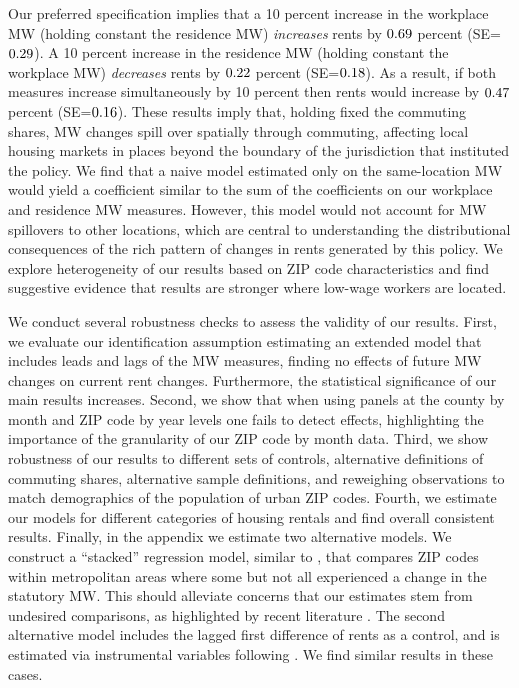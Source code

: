 Our preferred specification implies that 
a 10 percent increase in the workplace MW (holding constant the residence MW) 
\textit{increases} rents by $\textnormal{0.69}$ percent 
(SE=$\textnormal{0.29}$).
A 10 percent increase in the residence MW (holding constant the workplace MW) 
\textit{decreases} rents by $\textnormal{0.22}$ percent 
(SE=$\textnormal{0.18}$). 
As a result, if both measures increase simultaneously by 10 percent then 
rents would increase by $\textnormal{0.47}$ percent 
(SE=$\textnormal{0.16}$).
These results imply that, holding fixed the commuting shares, MW 
changes spill over spatially through commuting, affecting local housing markets 
in places beyond the boundary of the jurisdiction that instituted the policy.
We find that a naive model estimated only on the same-location MW would yield a 
coefficient similar to the sum of the coefficients on our workplace and 
residence MW measures.
However, this model would not account for MW spillovers to other locations, 
which are central to understanding the distributional consequences of the rich 
pattern of changes in rents generated by this policy.
We explore heterogeneity of our results based on ZIP code characteristics and
find suggestive evidence that results are stronger where low-wage workers are 
located.


We conduct several robustness checks to assess the validity of our results.
First, we evaluate our identification assumption estimating an extended model 
that includes leads and lags of the MW measures, finding no effects of future 
MW changes on current rent changes.
Furthermore, the statistical significance of our main results increases.
Second, we show that when using panels at the county by month and ZIP code by 
year levels one fails to detect effects, highlighting the importance of the 
granularity of our ZIP code by month data.
Third, we show robustness of our results to different sets of controls,
alternative definitions of commuting shares, alternative sample definitions,
and reweighing observations to match demographics of the population of
urban ZIP codes.
Fourth, we estimate our models for different categories of housing rentals and
find overall consistent results.
Finally, in the appendix we estimate two alternative models.
We construct a ``stacked'' regression model, similar to \textcite{CegnizEtAl2019},
that compares ZIP codes within metropolitan areas where some but not all 
experienced a change in the statutory MW.
This should alleviate concerns that our estimates stem from undesired 
comparisons, as highlighted by recent literature 
\parencite{deChaisemartinEtAl2022,RothEtAl2022}.
The second alternative model includes the lagged first difference of rents as 
a control, and is estimated via instrumental variables following 
\textcite{ArellanoBond1991}.
We find similar results in these cases.

